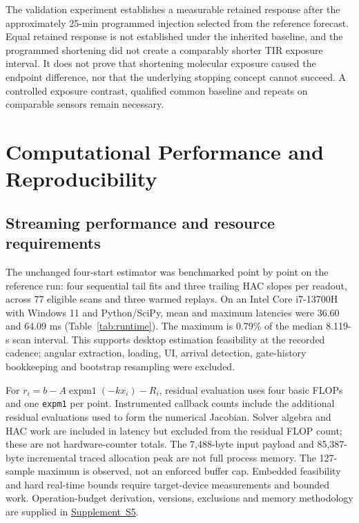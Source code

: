 \documentclass[lettersize,journal]{IEEEtran}
\newcommand{\supp}[1]{\href{SPR_smart_stop_supplement.pdf}{Supplement~#1}}
\begin{document}
The validation experiment establishes a measurable retained response
after the approximately 25-min programmed injection selected from the
reference forecast. Equal retained response is not established under the
inherited baseline, and the programmed shortening did not create a
comparably shorter TIR exposure interval. It does not prove that shortening molecular exposure
caused the endpoint difference, nor that the underlying stopping concept
cannot succeed. A controlled exposure contrast, qualified common baseline
and repeats on comparable sensors remain necessary.

\section{Computational Performance and Reproducibility}\label{sec:runtime}
\subsection{Streaming performance and resource requirements}
The unchanged four-start estimator was benchmarked point by point on the
reference run: four sequential tail fits and three trailing HAC slopes
per readout, across 77 eligible scans and three warmed replays. On an
Intel Core i7-13700H with Windows 11 and Python/SciPy, mean and maximum
latencies were 36.60 and 64.09 ms (Table~\ref{tab:runtime}). The maximum
is 0.79\% of the median 8.119-s scan interval. This supports desktop
estimation feasibility at the recorded cadence; angular extraction,
loading, UI, arrival detection, gate-history bookkeeping and bootstrap
resampling were excluded.

For $r_i=b-A\operatorname{expm1}(-kx_i)-R_i$, residual evaluation uses
four basic FLOPs and one \texttt{expm1} per point. Instrumented callback
counts include the additional residual evaluations used to form the
numerical Jacobian. Solver algebra and HAC work are included
in latency but excluded from the residual FLOP count; these are not
hardware-counter totals. The 7,488-byte input payload and 85,387-byte
incremental traced allocation peak are not full process memory. The
127-sample maximum is observed, not an enforced buffer cap. Embedded
feasibility and hard real-time bounds require target-device measurements
and bounded work. Operation-budget derivation, versions, exclusions and
memory methodology are supplied in \supp{S5}.
\end{document}
